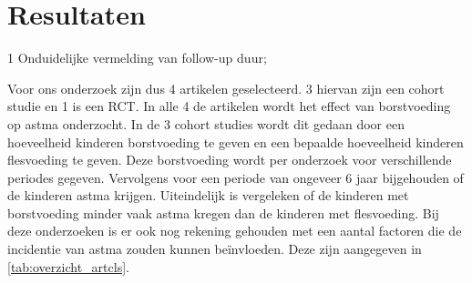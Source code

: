 \documentclass[table,abstract=true]{scrartcl}
\begin{document}
\section{Resultaten}
\begin{table}
   \centering
   \begin{threeparttable}
\begin{tablenotes}
\item[1] Onduidelijke vermelding van follow-up duur;
\end{tablenotes}

\end{threeparttable}
\label{tab:overzicht_artcls}
\end{table}

Voor ons onderzoek zijn dus 4 artikelen geselecteerd. 3 hiervan zijn een cohort studie en 1 is een RCT. In alle 4 de artikelen wordt het effect van borstvoeding op astma onderzocht. In de 3 cohort studies wordt dit gedaan door een hoeveelheid kinderen borstvoeding te geven en een bepaalde hoeveelheid kinderen flesvoeding te geven. Deze borstvoeding wordt per onderzoek voor verschillende periodes gegeven. Vervolgens voor een periode van ongeveer 6 jaar bijgehouden of de kinderen astma krijgen. Uiteindelijk is vergeleken of de kinderen met borstvoeding minder vaak astma kregen dan de kinderen met flesvoeding. Bij deze onderzoeken is er ook nog rekening gehouden met een aantal factoren die de incidentie van astma zouden kunnen beïnvloeden. Deze zijn aangegeven in \cref{tab:overzicht_artcls}.
\end{document}
